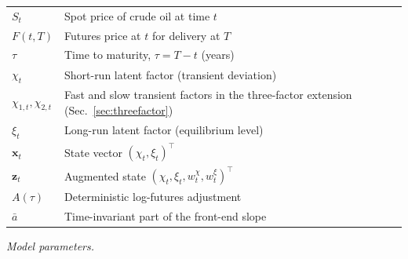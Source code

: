 \documentclass[journal]{IEEEtran}
\begin{document}
\smallskip
\begin{tabular}{@{}p{2.0cm}@{}p{5.95cm}@{}}
$S_t$            & Spot price of crude oil at time $t$ \\
$F(t,T)$         & Futures price at $t$ for delivery at $T$ \\
$\tau$           & Time to maturity, $\tau = T - t$ (years) \\
$\chi_t$         & Short-run latent factor (transient deviation) \\
$\chi_{1,t},\chi_{2,t}$ & Fast and slow transient factors in the three-factor extension (Sec.~\ref{sec:threefactor}) \\
$\xi_t$          & Long-run latent factor (equilibrium level) \\
$\bm{x}_t$       & State vector $(\chi_t,\xi_t)^{\!\top}$ \\
$\bm{z}_t$       & Augmented state $(\chi_t,\xi_t,w^\chi_t,w^\xi_t)^{\!\top}$ \\
$A(\tau)$        & Deterministic log-futures adjustment \\
$\bar{a}$        & Time-invariant part of the front-end slope \\
\end{tabular}

\smallskip
\noindent\textit{Model parameters.}
\end{document}
